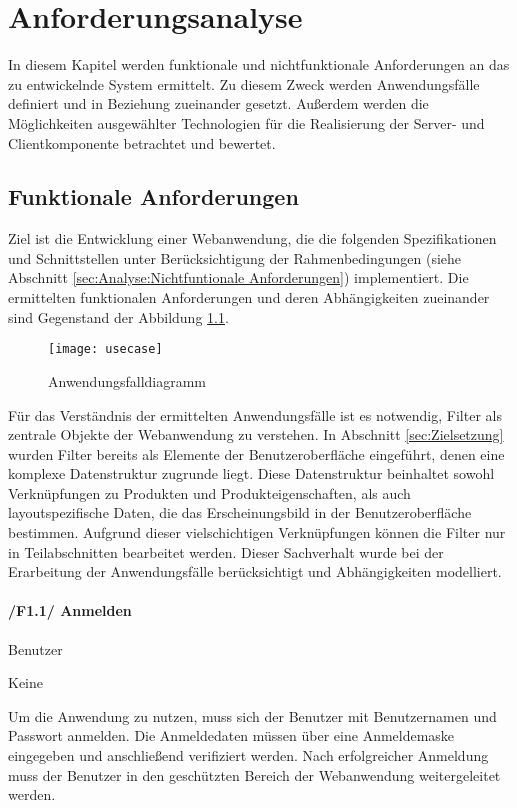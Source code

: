 \chapter{Anforderungsanalyse}
\label{cha:Anforderungsanalyse}

In diesem Kapitel werden funktionale und nichtfunktionale Anforderungen an das zu entwickelnde System ermittelt. Zu diesem Zweck werden Anwendungsfälle definiert und in Beziehung zueinander gesetzt. Außerdem werden die Möglichkeiten ausgewählter Technologien für die Realisierung der Server- und Clientkomponente betrachtet und bewertet.

\section{Funktionale Anforderungen}
\label{sec:Funktionale Anforderungen}

Ziel ist die Entwicklung einer Webanwendung, die die folgenden Spezifikationen und Schnittstellen unter Berücksichtigung der Rahmenbedingungen (siehe Abschnitt \ref{sec:Analyse:Nichtfuntionale Anforderungen}) implementiert. Die ermittelten funktionalen Anforderungen und deren Abhängigkeiten zueinander sind Gegenstand der Abbildung \ref{fig:usecase}. 

\begin{figure}[H]
\centering
\texttt{[image: usecase]} %
\caption{Anwendungsfalldiagramm}
\label{fig:usecase}
\end{figure}

Für das Verständnis der ermittelten Anwendungsfälle ist es notwendig, Filter als zentrale Objekte der Webanwendung zu verstehen. In Abschnitt \ref{sec:Zielsetzung} wurden Filter bereits als Elemente der Benutzeroberfläche eingeführt, denen eine komplexe Datenstruktur zugrunde liegt. Diese Datenstruktur beinhaltet sowohl Verknüpfungen zu Produkten und Produkteigenschaften, als auch layoutspezifische Daten, die das Erscheinungsbild in der Benutzeroberfläche bestimmen. Aufgrund dieser vielschichtigen Verknüpfungen können die Filter nur in Teilabschnitten bearbeitet werden. Dieser Sachverhalt wurde bei der Erarbeitung der Anwendungsfälle berücksichtigt und Abhängigkeiten modelliert.

\subsubsection{/F1.1/ Anmelden}

\begin{description}[leftmargin=8em,style=nextline]
\item[Akteure] Benutzer
\item[Includes] Keine
\item[Beschreibung]
Um die Anwendung zu nutzen, muss sich der Benutzer mit Benutzernamen und Passwort anmelden. Die Anmeldedaten müssen über eine Anmeldemaske eingegeben und anschließend verifiziert werden. Nach erfolgreicher Anmeldung muss der Benutzer in den geschützten Bereich der Webanwendung weitergeleitet werden.
\end{description}

